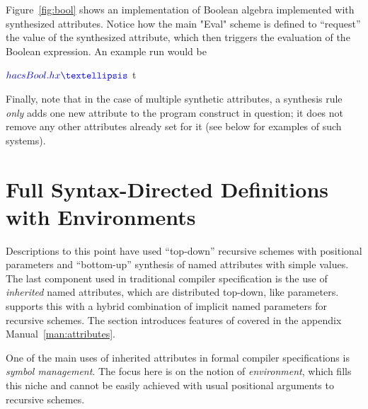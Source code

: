 \documentclass[11pt]{article} %
\begin{document}
\begin{example}\label{ex:bool}
  Figure~\ref{fig:bool} shows an implementation of Boolean algebra implemented with synthesized
  attributes. Notice how the main "Eval" scheme is defined to ``request'' the value of the
  synthesized attribute, which then triggers the evaluation of the Boolean expression. An example
  run would be
  \begin{code}[commandchars=\\\{\}]
$ \textcolorinput{hacs Bool.hx}
…
$ 
 t
  \end{code}
\end{example}

Finally, note that in the case of multiple synthetic attributes, a synthesis rule \emph{only} adds
one new attribute to the program construct in question; it does not remove any other attributes
already set for it (see below for examples of such systems). %


\section{Full Syntax-Directed Definitions with Environments}
\label{sec:sdd}

Descriptions to this point have used ``top-down'' recursive schemes with positional parameters and
``bottom-up'' synthesis of named attributes with simple values. The last component used in
traditional compiler specification is the use of \emph{inherited} named attributes, which are
distributed top-down, like parameters. \HAX supports this with a hybrid combination of implicit
named parameters for recursive schemes. The section introduces features of \HAX covered in the
appendix Manual~\ref{man:attributes}.

One of the main uses of inherited attributes in formal compiler specifications is \emph{symbol
  management}. The focus here is on the \HAX notion of \emph{environment}, which fills this niche
and cannot be easily achieved with usual positional arguments to recursive schemes.
\end{document}
